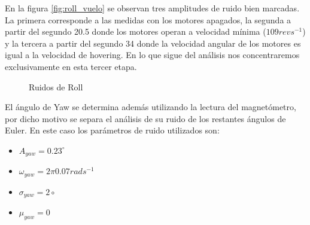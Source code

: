\documentclass[main]{subfiles}
\begin{document}
En la figura \ref{fig:roll_vuelo} se observan tres amplitudes de ruido bien marcadas. La primera corresponde a las medidas con los motores apagados, la segunda a partir del segundo 20.5 donde los motores operan a velocidad m\'inima ($109 rev s^{-1}$) y la tercera a partir del segundo 34 donde la velocidad angular de los motores es igual a la velocidad de hovering. En lo que sigue del an\'alisis nos concentraremos exclusivamente en esta tercer etapa.\\

\begin{figure}
  \centering
  \caption{Ruidos de Roll}
  \label{fig:ruidos_roll}
\end{figure}
  
El \'angulo de Yaw se determina adem\'as utilizando la lectura del magnet\'ometro, por dicho motivo se separa el an\'alisis de su ruido de los restantes \'angulos de Euler. En este caso los par\'ametros de ruido utilizados son:

\begin{itemize}
\item $A_{yaw} = 0.23^\circ$
\item $\omega_{yaw} = 2\pi 0.07 rad s^{-1}$
\item $\sigma_{yaw} = 2\circ$
\item $\mu_{yaw} = 0$
\end{itemize}
\end{document}
